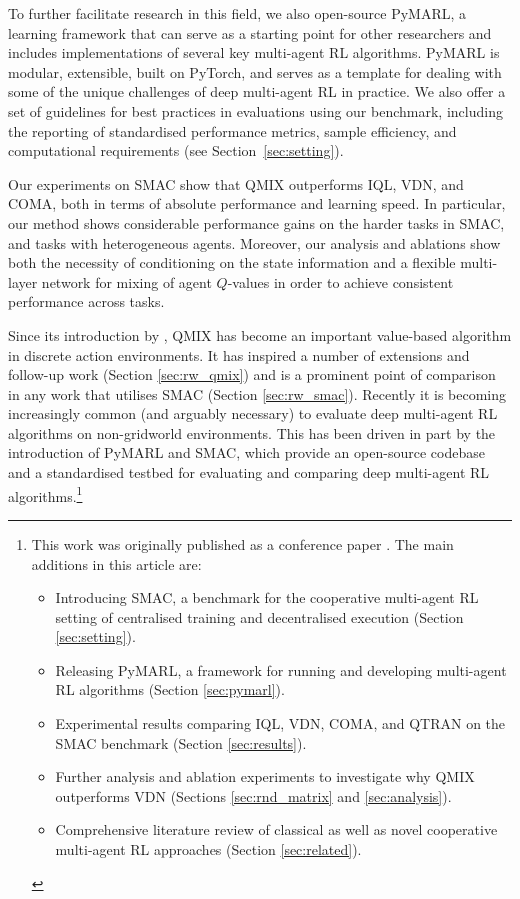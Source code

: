 \documentclass[twoside,11pt]{article}
\begin{document}
To further facilitate research in this field, we also open-source PyMARL,
a learning framework that can serve as a starting point for other researchers and includes implementations of several key multi-agent RL algorithms. PyMARL is modular, extensible, built on PyTorch, and serves as a template for dealing with some of the unique challenges of deep multi-agent RL in practice. 
We also offer a set of guidelines for best practices in evaluations using our benchmark, including the reporting of standardised performance metrics, sample efficiency, and computational requirements (see Section~\ref{sec:setting}).

Our experiments on SMAC show that QMIX outperforms IQL, VDN, and COMA, both in terms of absolute performance and learning speed.
In particular, our method shows considerable performance gains on the harder tasks in SMAC, and tasks with heterogeneous agents. 
Moreover, our analysis and ablations show both the necessity of 
conditioning on the state information and a flexible multi-layer network for mixing of agent 
$Q$-values in order to achieve consistent performance across tasks.

Since its introduction by \citet{rashid2018qmix}, QMIX has become an important value-based algorithm in discrete action environments. 
It has inspired a number of extensions and follow-up work (Section \ref{sec:rw_qmix}) and is a prominent point of comparison in any work that utilises SMAC (Section \ref{sec:rw_smac}). 
Recently it is 
becoming increasingly common (and arguably necessary) to evaluate deep multi-agent RL algorithms on non-gridworld environments.
This has been driven in part by the introduction of PyMARL and SMAC, which provide an open-source codebase and a standardised testbed for evaluating and comparing deep multi-agent RL algorithms.\footnote{
	This work was originally published as a conference paper \citep{rashid2018qmix}.
	The main additions in this article are:
	\begin{itemize}
		\item Introducing SMAC, a benchmark for the cooperative multi-agent RL setting of centralised training and decentralised execution (Section \ref{sec:setting}).
		\item Releasing PyMARL, a framework for running and developing multi-agent RL algorithms (Section \ref{sec:pymarl}).
		\item Experimental results comparing IQL, VDN, COMA, and QTRAN on the SMAC benchmark (Section \ref{sec:results}).
		\item Further analysis and ablation experiments to investigate why QMIX outperforms VDN (Sections \ref{sec:rnd_matrix} and \ref{sec:analysis}).
		\item Comprehensive literature review of classical as well as novel cooperative multi-agent RL approaches (Section \ref{sec:related}).
	\end{itemize}
}
\end{document}
